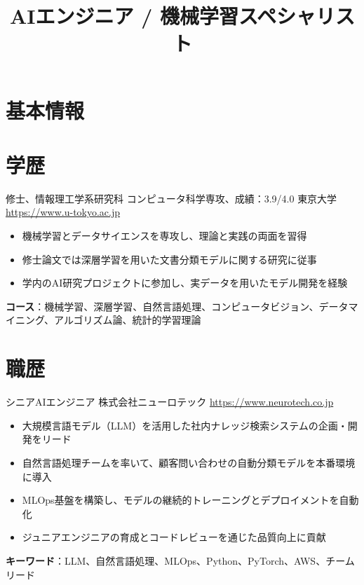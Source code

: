 \documentclass[a4paper, serif, 10pt]{moderncv}
\title{AIエンジニア / 機械学習スペシャリスト}
\begin{document}
\maketitle

\section{基本情報}

\section{学歴}

        {修士、情報理工学系研究科 コンピュータ科学専攻、成績：3.9/4.0}
        {東京大学}
        {\url{https://www.u-tokyo.ac.jp}}
        {}
        {\begin{itemize}
\item 機械学習とデータサイエンスを専攻し、理論と実践の両面を習得
\item 修士論文では深層学習を用いた文書分類モデルに関する研究に従事
\item 学内のAI研究プロジェクトに参加し、実データを用いたモデル開発を経験
\end{itemize}
\textbf{コース}：機械学習、深層学習、自然言語処理、コンピュータビジョン、データマイニング、アルゴリズム論、統計的学習理論}
\section{職歴}

        {シニアAIエンジニア}
        {株式会社ニューロテック}
        {\url{https://www.neurotech.co.jp}}
        {}
        {\begin{itemize}
\item 大規模言語モデル（LLM）を活用した社内ナレッジ検索システムの企画・開発をリード
\item 自然言語処理チームを率いて、顧客問い合わせの自動分類モデルを本番環境に導入
\item MLOps基盤を構築し、モデルの継続的トレーニングとデプロイメントを自動化
\item ジュニアエンジニアの育成とコードレビューを通じた品質向上に貢献
\end{itemize}
\textbf{キーワード}：LLM、自然言語処理、MLOps、Python、PyTorch、AWS、チームリード}
\end{document}
